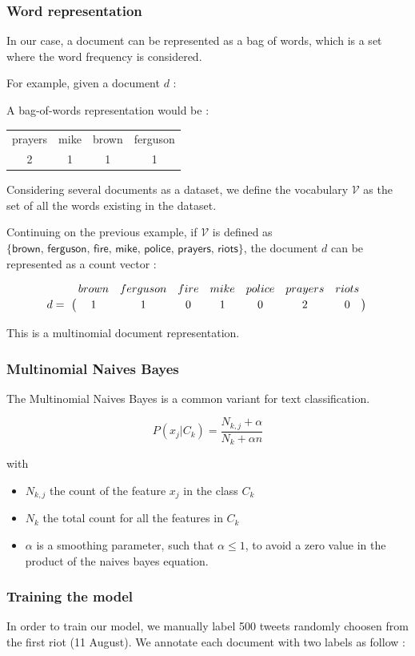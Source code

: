 \documentclass[a4paper,12pt]{report}
\begin{document}
\subsubsection{Word representation}

In our case, a document can be represented as a bag of words, which is a set where the word frequency is considered.

For example, given a document $d$ : 

A bag-of-words representation would be :
\begin{center}
\begin{tabular}{|c|c|c|c|}
prayers & mike & brown & ferguson \\
2 & 1 & 1 & 1
\end{tabular}
\end{center}

Considering several documents as a dataset, we define the vocabulary $\mathcal{V}$ as the set of all the words existing in the dataset.

Continuing on the previous example, if $\mathcal{V}$ is defined as $\{\textsf{brown, ferguson, fire, mike, police, prayers, riots}\}$, the document $d$ can be represented as a count vector :

$$
\bordermatrix{~ & brown & ferguson & fire & mike & police & prayers & riots \cr d =  & 1 & 1 & 0 & 1 & 0 & 2 & 0 \cr}
$$

This is a multinomial document representation.

\subsubsection{Multinomial Naives Bayes}
The Multinomial Naives Bayes is a common variant for text classification.

$$ 
\boxed{P(x_{j}| C_k ) = \frac{N_{k,j} + \alpha}{N_k + \alpha n}}
$$

with 
\begin{itemize}
\item $N_{k,j}$ the count of the feature $x_j$ in the class $C_k$
\item $N_{k}$ the total count for all the features in $C_k$
\item $\alpha$ is a smoothing parameter, such that $\alpha \leq 1$, to avoid a zero value in the product of the naives bayes equation.
\end{itemize}


\subsubsection{Training the model}
In order to train our model, we manually label 500 tweets randomly choosen from the first riot (11 August). We annotate each document with two labels as follow : 
\end{document}
